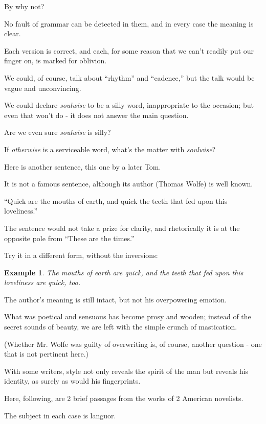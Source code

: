 \documentclass{article}
\newtheorem{example}{Example}
\begin{document}
By why not?

No fault of grammar can be detected in them, and in every case the meaning is clear.

Each version is correct, and each, for some reason that we can't readily put our finger on, is marked for oblivion.

We could, of course, talk about ``rhythm'' and ``cadence,'' but the talk would be vague and unconvincing.

We could declare {\it soulwise} to be a silly word,    inappropriate to the occasion; but even that won't do - it does not answer the main question.

Are we even sure {\it soulwise} is silly?

If {\it otherwise} is a serviceable word, what's the matter with {\it soulwise}?

%
Here is another sentence, this one by a later Tom.

It is not a famous sentence, although its author (Thomas Wolfe) is well known.

``Quick are the mouths of earth, and quick the teeth that fed upon this loveliness.''

The sentence would not take a prize for clarity, and rhetorically it is at the opposite pole from ``These are the times.''

Try it in a different form, without the inversions:
\begin{example}
	The mouths of earth are quick, and the teeth that fed upon this loveliness are quick, too.
\end{example}
The author's meaning is still intact, but not his overpowering emotion.

What was poetical and sensuous has become prosy and wooden; instead of the secret sounds of beauty, we are left with the simple crunch of mastication.

(Whether Mr. Wolfe was guilty of overwriting is, of course, another question - one that is not pertinent here.)

%
With some writers, style not only reveals the spirit of the man but reveals his identity, as surely as would his fingerprints.

Here, following, are 2 brief passages from the works of 2 American novelists.

The subject in each case is languor.
\end{document}
